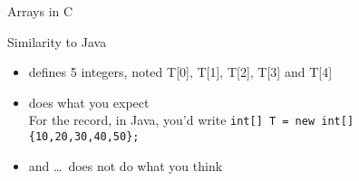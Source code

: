 \begin{Coupe}
\begin{frame}{Arrays in C}
  \begin{block}{Similarity to Java}
    \begin{itemize}
    \item {}  defines 5 integers, noted T[0], T[1], T[2],
      T[3] and T[4]
    \item {}  does what you expect\\
      For the record, in Java, you'd write \texttt{\small int[] T = new int[] \{10,20,30,40,50\};}
    \item {}  and
       \ldots\ does not do what you think
    \end{itemize}
  \end{block}\vspace{-.4\baselineskip}


\end{frame}
\end{Coupe}

